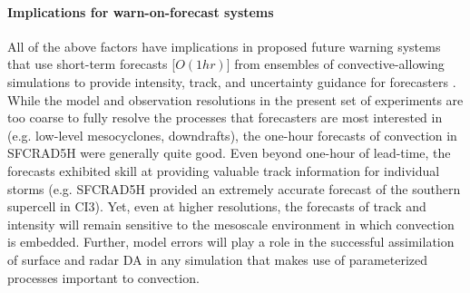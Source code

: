 \paragraph{Implications for warn-on-forecast systems}
All of the above factors have implications in proposed future warning systems that use short-term forecasts [\(O(1hr)\)] from ensembles of convective-allowing simulations to provide intensity, track, and uncertainty guidance for forecasters \citep{stensrudetal09a,stensrudetal13}. While the model and observation resolutions in the present set of experiments are too coarse to fully resolve the processes that forecasters are most interested in (e.g. low-level mesocyclones, downdrafts), the one-hour forecasts of convection in SFCRAD5H were generally quite good. Even beyond one-hour of lead-time, the forecasts exhibited skill at providing valuable track information for individual storms (e.g. SFCRAD5H provided an extremely accurate forecast of the southern supercell in CI3).  Yet, even at higher resolutions, the forecasts of track and intensity will remain sensitive to the mesoscale environment in which convection  is embedded. Further, model errors will play a role in the successful assimilation of surface and radar DA in any simulation that makes use of parameterized processes important to convection.
